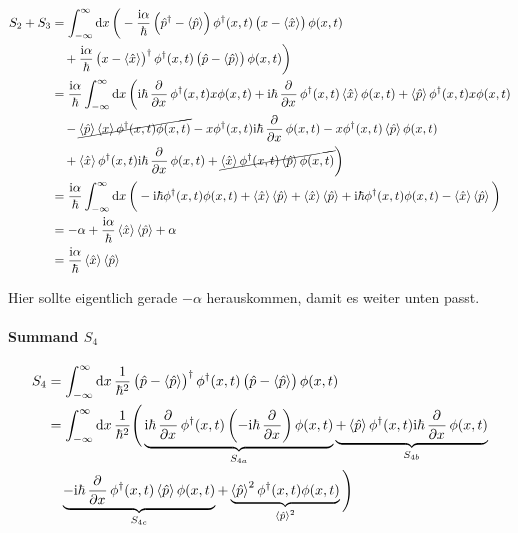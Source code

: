 \begin{align*}
	S_2 + S_3
	&= \int_{-\infty}^\infty \dif x \, \bigg(
	- \frac{\ii \alpha}{\hbar} \del{\hat p^\dagger - \bracket{\hat p}} \phi^\dagger(x, t) \del{x - \bracket{\hat x}} \phi(x, t) \\
	&\quad + \frac{\ii \alpha}{\hbar} \del{x - \bracket{\hat x}}^\dagger \phi^\dagger(x, t) \del{\hat p - \bracket{\hat p}} \phi(x, t)
	\bigg) \\
	&= \frac{\ii \alpha}{\hbar} \int_{-\infty}^\infty \dif x \, \bigg(
	\ii \hbar \dpd{}x \phi^\dagger(x, t) x \phi(x, t) + \ii \hbar \dpd{}x \phi^\dagger(x, t) \bracket{\hat x} \phi(x, t) + \bracket{\hat p} \phi^\dagger(x, t) x \phi(x, t) \\
	&\quad - \cancel{\bracket{\hat p} \bracket{x} \phi^\dagger(x, t) \phi(x, t)}
	- x \phi^\dagger(x, t) \ii \hbar \dpd{}x \phi(x, t) - x \phi^\dagger(x, t) \bracket{\hat p} \phi(x, t) \\
	&\quad + \bracket{\hat x} \phi^\dagger(x, t) \ii \hbar \dpd{}x \phi(x, t) + \cancel{\bracket{\hat x} \phi^\dagger(x, t) \bracket{\hat p} \phi(x, t)}
	\bigg) \\
	&= \frac{\ii \alpha}{\hbar} \int_{-\infty}^\infty \dif x \, \bigg(
	- \ii \hbar \phi^\dagger(x, t) \phi(x, t) + \bracket{\hat x} \bracket{\hat p} + \bracket{\hat x} \bracket{\hat p} + \ii \hbar \phi^\dagger(x, t) \phi(x, t) - \bracket{\hat x} \bracket{\hat p}
	\bigg) \\
	&= - \alpha + \frac{\ii \alpha}{\hbar} \bracket{\hat x} \bracket{\hat p} + \alpha \\
	&= \frac{\ii \alpha}{\hbar} \bracket{\hat x} \bracket{\hat p}
\end{align*}

Hier sollte eigentlich gerade $-\alpha$ herauskommen, damit es weiter unten
passt.

\paragraph{Summand $S_4$}

\begin{align*}
	S_4
	&= \int_{-\infty}^\infty \dif x \, \frac{1}{\hbar^2} \del{\hat p - \bracket{\hat p}}^\dagger \phi^\dagger(x, t) \del{\hat p - \bracket{\hat p}} \phi(x, t) \\
	&= \int_{-\infty}^\infty \dif x \, \frac{1}{\hbar^2} \Bigg(
	\underbrace{
		\ii \hbar \dpd{}x \phi^\dagger(x, t) \del{- \ii \hbar \dpd{}x} \phi(x, t)
}_{S_{4a}}
	\underbrace{
	+
	\bracket{\hat p} \phi^\dagger(x, t) \ii \hbar \dpd{}x \phi(x, t)
}_{S_{4b}} \\
&\quad \underbrace{
	-
	\ii \hbar \dpd{}x \phi^\dagger(x, t) \bracket{\hat p} \phi(x, t)
}_{S_{4c}}
	+ \underbrace{\bracket{\hat p}^2 \phi^\dagger(x, t) \phi(x, t)}_{\bracket{\hat p}^2}
	\Bigg)
\end{align*}

